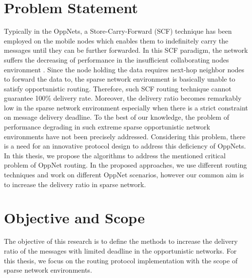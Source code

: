 \section{Problem Statement}
\label{intro:Problem Statement}


Typically in the OppNets, a Store-Carry-Forward (SCF) technique has been employed on the mobile nodes which enables them to indefinitely carry the messages until they can be further forwarded.
%
In this SCF paradigm, the network suffers the decreasing of performance in the insufficient collaborating nodes environment \cite{Nousiainen2013,Spyropoulos2010}.
%
Since the node holding the data requires next-hop neighbor nodes to forward the data to, the sparse network environment is basically unable to satisfy opportunistic routing.
%
Therefore, such SCF routing technique cannot guarantee 100\% delivery rate. 
%
Moreover, the delivery ratio becomes remarkably low in the sparse network environment especially when there is a strict constraint on message delivery deadline.
%
To the best of our knowledge, the problem of performance degrading in such extreme sparse opportunistic network environments have not been precisely addressed.
%
Considering this problem, there is a need for an innovative protocol design to address this deficiency of OppNets.
%
In this thesis, we propose the algorithms to address the mentioned critical problem of OppNet routing.
%
In the proposed approaches, we use different routing techniques and work on different OppNet scenarios, however our common aim is to increase the delivery ratio in sparse network.



\section{Objective and Scope}
\label{intro:Objective and Scope}
The objective of this research is to define the methods to increase the delivery ratio of the messages with limited deadline in the opportunistic networks.
%
For this thesis, we focus on the routing protocol implementation with the scope of sparse network environments.

